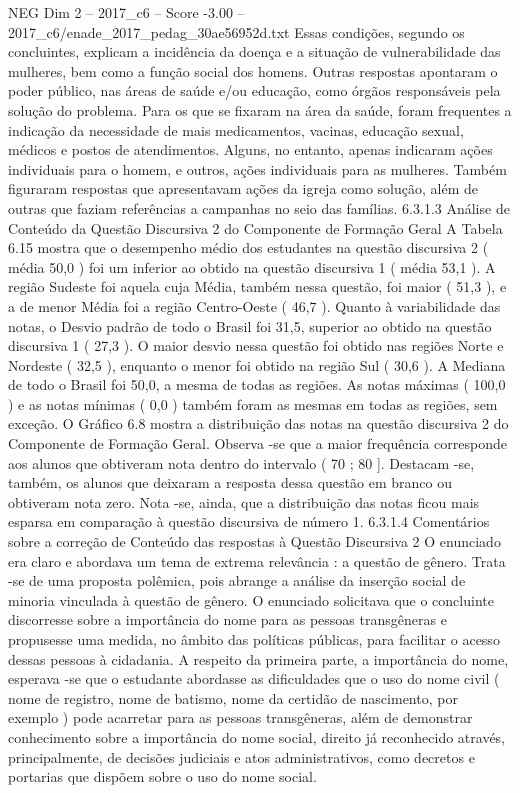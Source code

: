 \begin{textsample}{NEG Dim 2 – 2017\_c6 – Score -3.00 – 2017\_c6/enade\_2017\_pedag\_30ae56952d.txt}
Essas condições, segundo os concluintes, explicam a incidência da doença e a situação de vulnerabilidade das mulheres, bem como a função social dos homens.
Outras respostas apontaram o poder público, nas áreas de saúde e/ou educação, como órgãos responsáveis pela solução do problema.
Para os que se fixaram na área da saúde, foram frequentes a indicação da necessidade de mais medicamentos, vacinas, educação sexual, médicos e postos de atendimentos.
Alguns, no entanto, apenas indicaram ações individuais para o homem, e outros, ações individuais para as mulheres.
Também figuraram respostas que apresentavam ações da igreja como solução, além de outras que faziam referências a campanhas no seio das famílias. 6.3.1.3 Análise de Conteúdo da Questão Discursiva 2 do Componente de Formação Geral A Tabela 6.15 mostra que o desempenho médio dos estudantes na questão discursiva 2 ( média 50,0 ) foi um inferior ao obtido na questão discursiva 1 ( média 53,1 ).
A região Sudeste foi aquela cuja Média, também nessa questão, foi maior ( 51,3 ), e a de menor Média foi a região Centro-Oeste ( 46,7 ).
Quanto à variabilidade das notas, o Desvio padrão de todo o Brasil foi 31,5, superior ao obtido na questão discursiva 1 ( 27,3 ).
O maior desvio nessa questão foi obtido nas regiões Norte e Nordeste ( 32,5 ), enquanto o menor foi obtido na região Sul ( 30,6 ).
A Mediana de todo o Brasil foi 50,0, a mesma de todas as regiões.
As notas máximas ( 100,0 ) e as notas mínimas ( 0,0 ) também foram as mesmas em todas as regiões, sem exceção.
O Gráfico 6.8 mostra a distribuição das notas na questão discursiva 2 do Componente de Formação Geral.
Observa -se que a maior frequência corresponde aos alunos que obtiveram nota dentro do intervalo ( 70 ; 80 ].
Destacam -se, também, os alunos que deixaram a resposta dessa questão em branco ou obtiveram nota zero.
Nota -se, ainda, que a distribuição das notas ficou mais esparsa em comparação à questão discursiva de número 1. 6.3.1.4 Comentários sobre a correção de Conteúdo das respostas à Questão Discursiva 2 O enunciado era claro e abordava um tema de extrema relevância : a questão de gênero.
Trata -se de uma proposta polêmica, pois abrange a análise da inserção social de minoria vinculada à questão de gênero.
O enunciado solicitava que o concluinte discorresse sobre a importância do nome para as pessoas transgêneras e propusesse uma medida, no âmbito das políticas públicas, para facilitar o acesso dessas pessoas à cidadania.
A respeito da primeira parte, a importância do nome, esperava -se que o estudante abordasse as dificuldades que o uso do nome civil ( nome de registro, nome de batismo, nome da certidão de nascimento, por exemplo ) pode acarretar para as pessoas transgêneras, além de demonstrar conhecimento sobre a importância do nome social, direito já reconhecido através, principalmente, de decisões judiciais e atos administrativos, como decretos e portarias que dispõem sobre o uso do nome social.

\end{textsample}
